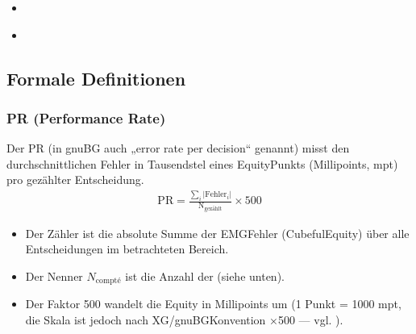 \documentclass[letterpaper,10pt,german]{sphinxmanual}
\begin{document}
\begin{sphinxcontents}
\begin{itemize}
\begin{itemize}
\item {} 
\sphinxAtStartPar
{}\label{\detokenize{stats_parity:id11}}{\hyperref[\detokenize{stats_parity:comparaison-gnubg-blunderdb-import-sgf-moteurs-differents}]{}}

\end{itemize}

\item {} 
\sphinxAtStartPar
{}\label{\detokenize{stats_parity:id12}}{\hyperref[\detokenize{stats_parity:valider-vos-propres-chiffres}]{}}

\item {} 
\sphinxAtStartPar
{}\label{\detokenize{stats_parity:id13}}{\hyperref[\detokenize{stats_parity:reference-gnubg}]{}}

\end{itemize}
\end{sphinxcontents}


\subsection{Formale Definitionen}
\label{\detokenize{stats_parity:definitions-formelles}}

\subsubsection{PR (Performance Rate)}
\label{\detokenize{stats_parity:pr-performance-rate}}
\sphinxAtStartPar
Der PR (in gnuBG auch „error rate per decision“ genannt) misst den durchschnittlichen Fehler in Tausendstel eines Equity\sphinxhyphen{}Punkts (Millipoints, mpt) pro gezählter Entscheidung.
\begin{equation*}
\begin{split}\mathrm{PR} = \frac{\sum_i |\mathrm{Fehler}_i|}{\mathrm{N_{gezählt}}} \times 500\end{split}
\end{equation*}\begin{itemize}
\item {} 
\sphinxAtStartPar
Der Zähler ist die absolute Summe der EMG\sphinxhyphen{}Fehler (Cubeful\sphinxhyphen{}Equity) über alle Entscheidungen im betrachteten Bereich.

\item {} 
\sphinxAtStartPar
Der Nenner \(N_\text{compté}\) ist die Anzahl der  (siehe unten).

\item {} 
\sphinxAtStartPar
Der Faktor 500 wandelt die Equity in Millipoints um (1 Punkt = 1000 mpt, die Skala ist jedoch nach XG/gnuBG\sphinxhyphen{}Konvention ×500 — vgl. ).

\end{itemize}
\end{document}
